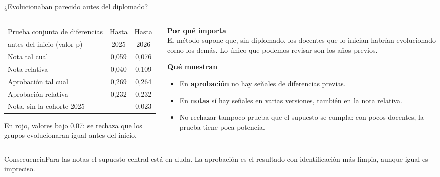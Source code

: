\documentclass[10pt,aspectratio=169]{beamer}
\newcommand{\sintesis}[2]{%
  \begin{block}{#1}#2\end{block}}
\begin{document}
\begin{frame}{¿Evolucionaban parecido antes del diplomado?}
  \begin{columns}[c]
    \begin{column}{0.55\textwidth}
      \begin{table}\small
        \begin{tabular}{lcc}
          \toprule
          Prueba conjunta de diferencias & Hasta & Hasta \\
          antes del inicio (valor p) & 2025 & 2026 \\
          \midrule
          Nota tal cual & \alert{0,059} & 0,076 \\
          Nota relativa & \alert{0,040} & 0,109 \\
          Aprobación tal cual & 0,269 & 0,264 \\
          Aprobación relativa & 0,232 & 0,232 \\
          \midrule
          Nota, sin la cohorte 2025 & -- & \alert{0,023} \\
          \bottomrule
        \end{tabular}
      \end{table}
      {\scriptsize En rojo, valores bajo 0,07: se rechaza que los grupos evolucionaran igual antes del inicio.}
    \end{column}
    \begin{column}{0.43\textwidth}\small
      \textbf{Por qué importa}\\
      El método supone que, sin diplomado, los docentes que lo inician habrían evolucionado como los demás. Lo único que podemos revisar son los años previos.
      \vspace{0.4em}

      \textbf{Qué muestran}
      \begin{itemize}
        \item En \textbf{aprobación} no hay señales de diferencias previas.
        \item En \textbf{notas} sí hay señales en varias versiones, también en la nota relativa.
        \item No rechazar tampoco prueba que el supuesto se cumpla: con pocos docentes, la prueba tiene poca potencia.
      \end{itemize}
    \end{column}
  \end{columns}
  \sintesis{Consecuencia}{Para las notas el supuesto central está en duda. La aprobación es el resultado con identificación más limpia, aunque igual es impreciso.}
\end{frame}
\end{document}
